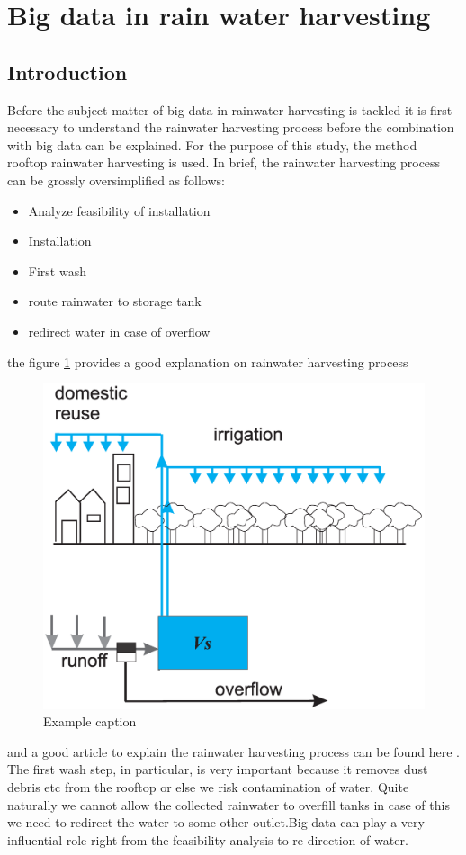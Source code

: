 \documentclass[sigconf]{acmart}
\begin{document}
\section{Big data in rain water harvesting}

\subsection{Introduction}
Before the subject matter of big data in rainwater harvesting is tackled it is first necessary to understand the rainwater harvesting process before the combination with big data can be explained. For the purpose of this study, the method rooftop rainwater harvesting is used. In brief, the rainwater harvesting process can be grossly oversimplified as follows:
\begin{itemize}
  \item Analyze feasibility of installation
  \item Installation
  \item First wash
  \item route rainwater to storage tank
  \item redirect water in case of overflow
\end{itemize}
the figure \ref{f:water} provides a good explanation on rainwater harvesting process
\begin{figure}[!ht]
  \centering\includegraphics[width=\columnwidth]{images/water.png}
  \caption{Example caption}\label{f:water}
\end{figure} 
and a good article to explain the rainwater harvesting process can be found here \cite{Wikipedia2016}. The first wash step, in particular, is very important because it removes dust debris etc from the rooftop or else we risk contamination of water. Quite naturally we cannot allow the collected rainwater to overfill tanks in case of this we need to redirect the water to some other outlet.Big data can play a very influential role right from the feasibility analysis to re direction of water.
\end{document}
